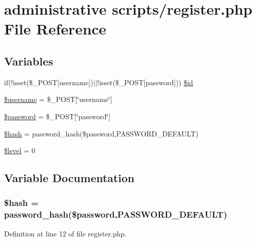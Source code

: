 \hypertarget{register_8php}{}\section{administrative scripts/register.php File Reference}
\label{register_8php}
\subsection*{Variables}
\begin{DoxyCompactItemize}
\item 
if(!isset(\$\+\_\+\+P\+O\+ST\mbox{[}\textquotesingle{}username\textquotesingle{}\mbox{]})$\vert$$\vert$!isset(\$\+\_\+\+P\+O\+ST\mbox{[}\textquotesingle{}password\textquotesingle{}\mbox{]})) \hyperlink{register_8php_ac29a1612b7f8fa7b187dcf924a5e1368}{\$id}
\item 
\hyperlink{register_8php_a0eb82aa5f81cf845de4b36cd653c42cf}{\$username} = \$\+\_\+\+P\+O\+ST\mbox{[}\char`\"{}username\char`\"{}\mbox{]}
\item 
\hyperlink{register_8php_a607686ef9f99ea7c42f4f3dd3dbb2b0d}{\$password} = \$\+\_\+\+P\+O\+ST\mbox{[}\char`\"{}password\char`\"{}\mbox{]}
\item 
\hyperlink{register_8php_ac9fdf6f2c8fb45c1d3bb9a176802b2ad}{\$hash} = password\+\_\+hash(\$password,P\+A\+S\+S\+W\+O\+R\+D\+\_\+\+D\+E\+F\+A\+U\+LT)
\item 
\hyperlink{register_8php_abd32cc82c6a3f79491987de36ad580ca}{\$level} = 0
\end{DoxyCompactItemize}


\subsection{Variable Documentation}
\subsubsection[{\texorpdfstring{\$hash}{$hash}}]{\setlength{\rightskip}{0pt plus 5cm}\$hash = password\+\_\+hash(\$password,P\+A\+S\+S\+W\+O\+R\+D\+\_\+\+D\+E\+F\+A\+U\+LT)}\hypertarget{register_8php_ac9fdf6f2c8fb45c1d3bb9a176802b2ad}{}\label{register_8php_ac9fdf6f2c8fb45c1d3bb9a176802b2ad}


Definition at line 12 of file register.\+php.

